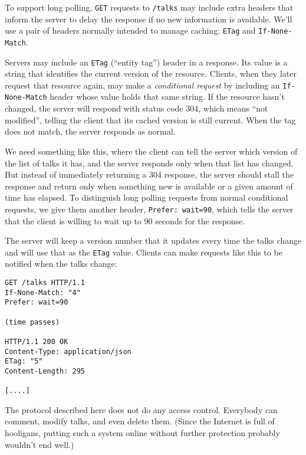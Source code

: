To support long polling, \lstinline`GET` requests to \lstinline`/talks` may include extra headers that inform the server to delay the response if no new information is available. We'll use a pair of headers normally intended to manage caching: \lstinline`ETag` and \lstinline`If-None-Match`.

Servers may include an \lstinline`ETag` (``entity tag'') header in a response. Its value is a string that identifies the current version of the resource. Clients, when they later request that resource again, may make a \emph{conditional request} by including an \lstinline`If-None-Match` header whose value holds that same string. If the resource hasn't changed, the server will respond with status code 304, which means ``not modified'', telling the client that its cached version is still current. When the tag does not match, the server responds as normal.

We need something like this, where the client can tell the server which version of the list of talks it has, and the server responds only when that list has changed. But instead of immediately returning a 304 response, the server should stall the response and return only when something new is available or a given amount of time has elapsed. To distinguish long polling requests from normal conditional requests, we give them another header, \lstinline`Prefer: wait=90`, which tells the server that the client is willing to wait up to 90 seconds for the response.

The server will keep a version number that it updates every time the talks change and will use that as the \lstinline`ETag` value. Clients can make requests like this to be notified when the talks change:

\begin{lstlisting}
GET /talks HTTP/1.1
If-None-Match: "4"
Prefer: wait=90

(time passes)

HTTP/1.1 200 OK
Content-Type: application/json
ETag: "5"
Content-Length: 295

[....]
\end{lstlisting}
\noindent{}

The protocol described here does not do any access control. Everybody can comment, modify talks, and even delete them. (Since the Internet is full of hooligans, putting such a system online without further protection probably wouldn't end well.)

